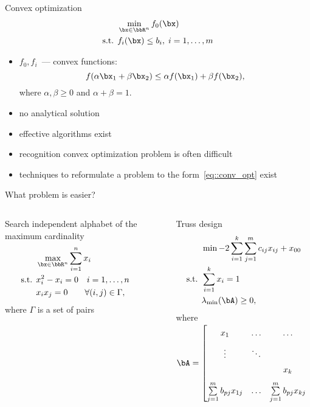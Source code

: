 \documentclass[12pt]{beamer}
\begin{document}
\begin{frame}{Convex optimization}
\begin{equation}
\begin{split}
&\min\limits_{\bx \in \bbR^n} f_0(\bx)\\
\text{s.t. } & f_i(\bx) \leq b_i, \; i = 1,\ldots, m
\end{split}
\label{eq::conv_opt}
\end{equation}
\begin{itemize}
\item $f_0, f_i$~--- convex functions:
\[
f(\alpha \bx_1 + \beta \bx_2) \leq \alpha f(\bx_1) + \beta f(\bx_2),
\]
where $\alpha, \beta \geq 0$ and $\alpha + \beta = 1$.
\item no analytical solution
\item effective algorithms exist
\item recognition convex optimization problem is often difficult
\item techniques to reformulate a problem to the form~\eqref{eq::conv_opt} exist
\end{itemize}
\end{frame}

\begin{frame}{What problem is easier?}

\begin{columns}[T]
\begin{column}{0.5\textwidth}
Search independent alphabet of the maximum cardinality
\begin{equation*}
\begin{split}
&\max\limits_{\bx \in \bbR^n} \sum\limits_{i=1}^n x_i\\
\text{s.t. } & x_i^2 - x_i = 0 \quad i = 1,\ldots, n\\
& x_ix_j = 0 \qquad \forall (i, j) \in \Gamma,
\end{split}
\end{equation*}
where $\Gamma$ is a set of pairs
\end{column}
~
\begin{column}{0.5\textwidth}
\small
Truss design
\begin{equation*}
\begin{split}
& \min -2\sum\limits_{i=1}^k\sum\limits_{j=1}^m c_{ij} x_{ij} + x_{00}\\
\text{s.t. } & \sum\limits_{i=1}^k x_i = 1\\
& \lambda_{\min}(\bA) \geq 0,
\end{split}
\end{equation*}
\scriptsize
where $\bA = 
\begin{bmatrix}
x_1 & \ldots & \ldots & \sum\limits_{j=1}^m b_{pj}x_{1j}\\
\vdots & \ddots & & \vdots\\
 & & x_k & \sum\limits_{j=1}^m b_{pj}x_{kj}\\
\sum\limits_{j=1}^m b_{pj}x_{1j} & \ldots & \sum\limits_{j=1}^m b_{pj}x_{kj} & x_{00}
\end{bmatrix}
$
\end{column}
\end{columns}

\end{frame}
\end{document}
